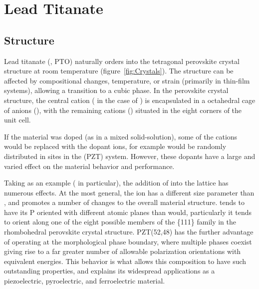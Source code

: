 \chapter{Lead Titanate}
\label{chap:Materials}
\thispagestyle{empty}



\section{Structure}
\label{sec:Materials-Struct}

Lead titanate (\PTO{}, PTO) naturally orders into the tetragonal perovskite crystal structure at room temperature (figure~\vref{fig:Crystals}). The structure can be affected by compositional changes, temperature, or strain (primarily in thin-film systems), allowing a transition to a cubic phase. In the perovskite crystal structure, the central cation (\TiIon{} in the case of \PTO{}) is encapsulated in a octahedral cage of anions (\OIon{}), with the remaining cations (\PbIon{}) situated in the eight corners of the unit cell.\cite{pan_abnormal_2001,harjuoja_2006,khan_deposition_2008,watanabe_growth_2007,kolpak_polarization_2007,chingprado_raman_1995,park_effect_2009,lee_effects_2009,lee_unusual_2010}

If the material was doped (as in a mixed solid-solution), some of the cations would be replaced with the dopant ions, for example \ZrIon{} would be randomly distributed in  \TiIon{} sites in the \PZT{} (PZT) system.
\cite{pan_abnormal_2001,harjuoja_2006,khan_deposition_2008,watanabe_growth_2007,kolpak_polarization_2007,chingprado_raman_1995,park_effect_2009,lee_effects_2009,lee_unusual_2010} However, these dopants have a large and varied effect on the material behavior and performance. 

Taking \PZT{} as an example ( in particular), the addition of \ZrIon{} into the lattice has numerous effects. At the most general, the \ZrIon{} ion has a different size parameter than \TiIon{}, and promotes a number of changes to the overall material structure.\cite{du_crystal_1998,guo_origin_2000,haertling_ferroelectric_1999,liu_self-biased_2000,Muralt_2000,muralt_ferroelectric_2000,noheda_monoclinic_1999,rouquette_pressure_2004,scott_quantitative_1991} \PZT{} tends to have its P oriented with different atomic planes than \PTO{} would, particularly it tends to orient along one of the eight possible members of the \{111\} family in the rhombohedral perovskite crystal structure. PZT(52,48) has the further advantage of operating at the morphological phase boundary, where multiple phases coexist giving rise to a far greater number of allowable polarization orientations with equivalent energies. This behavior is what allows this composition to have such outstanding properties, and explains its widespread applications as a piezoelectric, pyroelectric, and ferroelectric material.\cite{du_crystal_1998,guo_origin_2000,haertling_ferroelectric_1999,liu_self-biased_2000,Muralt_2000,muralt_ferroelectric_2000,noheda_monoclinic_1999,rouquette_pressure_2004,scott_quantitative_1991}

